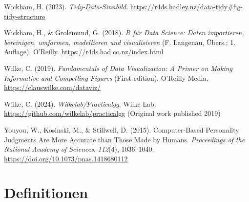 \documentclass[
  a4paper,
]{scrbook}
\newlength{\cslhangindent}
\newenvironment{CSLReferences}[2] %
 {\begin{list}{}{%
  \setlength{\itemindent}{0pt}
  \setlength{\leftmargin}{0pt}
  \setlength{\parsep}{0pt}
  \ifodd #1
   \setlength{\leftmargin}{\cslhangindent}
   \setlength{\itemindent}{-1\cslhangindent}
  \fi
  \setlength{\itemsep}{#2\baselineskip}}}
 {\end{list}}
\theoremstyle{definition}
\theoremstyle{definition}
\theoremstyle{definition}
\theoremstyle{remark}
\begin{document}
\begin{CSLReferences}{1}{0}
Wickham, H. (2023). \emph{Tidy-{Data-Sinnbild}}.
\url{https://r4ds.hadley.nz/data-tidy\#fig-tidy-structure}

Wickham, H., \& Grolemund, G. (2018). \emph{R für Data Science: Daten
importieren, bereinigen, umformen, modellieren und visualisieren} (F.
Langenau, Übers.; 1. Auflage). O'Reilly.
\url{https://r4ds.had.co.nz/index.html}

Wilke, C. (2019). \emph{Fundamentals of Data Visualization: A Primer on
Making Informative and Compelling Figures} (First edition). O'Reilly
Media. \url{https://clauswilke.com/dataviz/}

Wilke, C. (2024). \emph{Wilkelab/Practicalgg}. Wilke Lab.
\url{https://github.com/wilkelab/practicalgg} (Original work published
2019)

Youyou, W., Kosinski, M., \& Stillwell, D. (2015). Computer-Based
Personality Judgments Are More Accurate than Those Made by Humans.
\emph{Proceedings of the National Academy of Sciences}, \emph{112}(4),
1036--1040. \url{https://doi.org/10.1073/pnas.1418680112}

\end{CSLReferences}

\cleardoublepage
{}
{}
\appendix

\chapter{Definitionen}\label{definitionen}
\end{document}
